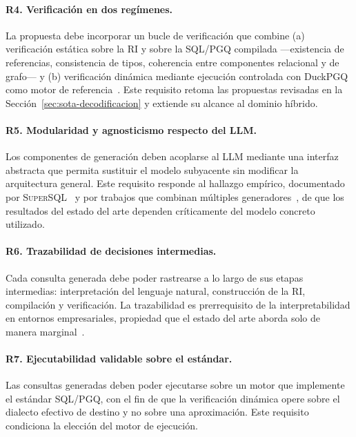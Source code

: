 \paragraph{R4. Verificación en dos regímenes.} La propuesta debe incorporar un bucle de verificación que combine (a) verificación estática sobre la \ac{RI} y sobre la \ac{SQL}/\ac{PGQ} compilada ---existencia de referencias, consistencia de tipos, coherencia entre componentes relacional y de grafo--- y (b) verificación dinámica mediante ejecución controlada con DuckPGQ como motor de referencia~\cite{DuckPGQ}. Este requisito retoma las propuestas revisadas en la Sección~\ref{sec:sota-decodificacion} y extiende su alcance al dominio híbrido.

\paragraph{R5. Modularidad y agnosticismo respecto del \ac{LLM}.} Los componentes de generación deben acoplarse al \ac{LLM} mediante una interfaz abstracta que permita sustituir el modelo subyacente sin modificar la arquitectura general. Este requisito responde al hallazgo empírico, documentado por \textsc{SuperSQL}~\cite{SuperSQL2024} y por trabajos que combinan múltiples generadores~\cite{CHASE-SQL2025, XiYan-SQL2024}, de que los resultados del estado del arte dependen críticamente del modelo concreto utilizado.

\paragraph{R6. Trazabilidad de decisiones intermedias.} Cada consulta generada debe poder rastrearse a lo largo de sus etapas intermedias: interpretación del lenguaje natural, construcción de la \ac{RI}, compilación y verificación. La trazabilidad es prerrequisito de la interpretabilidad en entornos empresariales, propiedad que el estado del arte aborda solo de manera marginal~\cite{Data2Decisions, NLinterfaces}.

\paragraph{R7. Ejecutabilidad validable sobre el estándar.} Las consultas generadas deben poder ejecutarse sobre un motor que implemente el estándar \ac{SQL}/\ac{PGQ}, con el fin de que la verificación dinámica opere sobre el dialecto efectivo de destino y no sobre una aproximación. Este requisito condiciona la elección del motor de ejecución.

